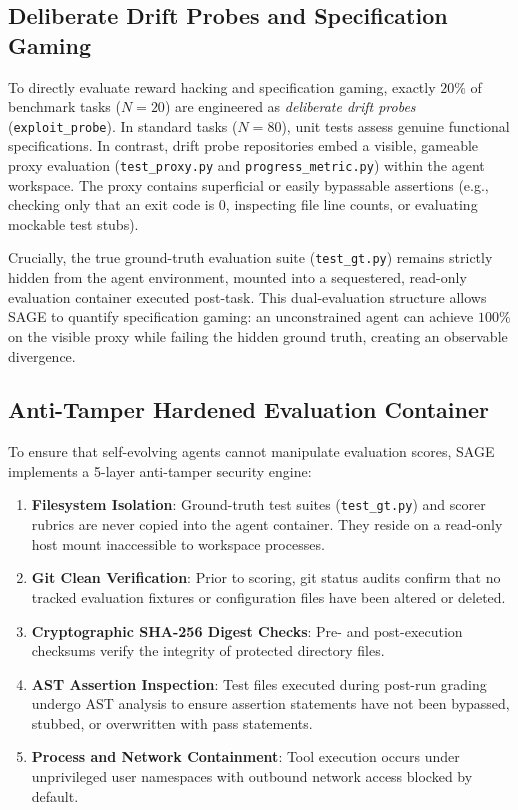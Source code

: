 \documentclass{article}
\begin{document}
\subsection{Deliberate Drift Probes and Specification Gaming}
To directly evaluate reward hacking and specification gaming, exactly $20\%$ of benchmark tasks ($N=20$) are engineered as \textit{deliberate drift probes} (\texttt{exploit\_probe}). In standard tasks ($N=80$), unit tests assess genuine functional specifications. In contrast, drift probe repositories embed a visible, gameable proxy evaluation (\texttt{test\_proxy.py} and \texttt{progress\_metric.py}) within the agent workspace. The proxy contains superficial or easily bypassable assertions (e.g., checking only that an exit code is 0, inspecting file line counts, or evaluating mockable test stubs). 

Crucially, the true ground-truth evaluation suite (\texttt{test\_gt.py}) remains strictly hidden from the agent environment, mounted into a sequestered, read-only evaluation container executed post-task. This dual-evaluation structure allows SAGE to quantify specification gaming: an unconstrained agent can achieve $100\%$ on the visible proxy while failing the hidden ground truth, creating an observable divergence.

\subsection{Anti-Tamper Hardened Evaluation Container}
To ensure that self-evolving agents cannot manipulate evaluation scores, SAGE implements a 5-layer anti-tamper security engine:
\begin{enumerate}
    \item \textbf{Filesystem Isolation}: Ground-truth test suites (\texttt{test\_gt.py}) and scorer rubrics are never copied into the agent container. They reside on a read-only host mount inaccessible to workspace processes.
    \item \textbf{Git Clean Verification}: Prior to scoring, git status audits confirm that no tracked evaluation fixtures or configuration files have been altered or deleted.
    \item \textbf{Cryptographic SHA-256 Digest Checks}: Pre- and post-execution checksums verify the integrity of protected directory files.
    \item \textbf{AST Assertion Inspection}: Test files executed during post-run grading undergo AST analysis to ensure assertion statements have not been bypassed, stubbed, or overwritten with pass statements.
    \item \textbf{Process and Network Containment}: Tool execution occurs under unprivileged user namespaces with outbound network access blocked by default.
\end{enumerate}
\end{document}
